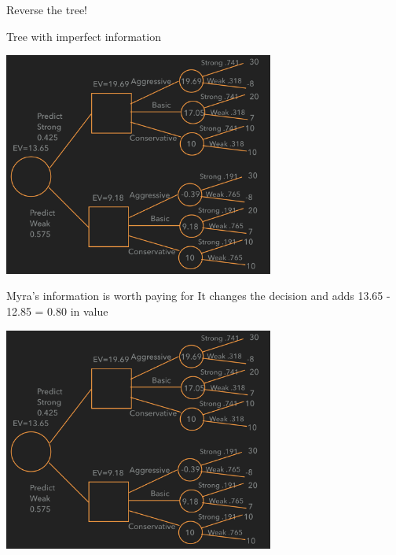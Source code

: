 \documentclass{beamer}\usepackage[]{graphicx}\usepackage[]{color}
\begin{document}
\begin{darkframes}
\begin{frame}[fragile]{Reverse the tree!}
    \end{frame}


    \begin{frame}[fragile]{Tree with imperfect information}
       
      \begin{center}
        \includegraphics[width=3.5in]{BevoImperfect} \\
      \end{center}

    \end{frame}


    \begin{frame}[fragile]{Myra's information is worth paying for}
       It changes the decision and adds 13.65 - 12.85 = 0.80 in value 
      \begin{center}
        \includegraphics[width=3.5in]{BevoImperfect} \\
      \end{center}

    \end{frame}



\end{darkframes}
\end{document}
